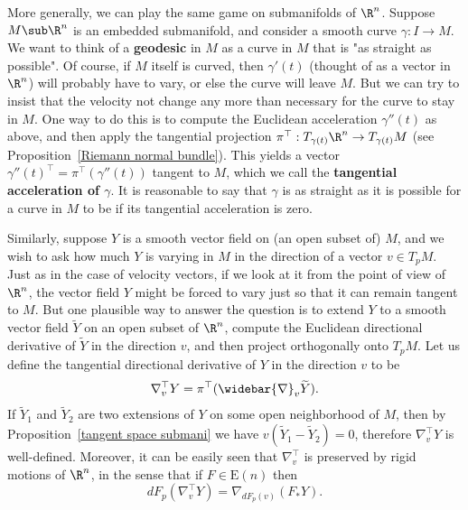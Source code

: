 More generally, we can play the same game on submanifolds of $\R^n$. Suppose $M\sub\R^n$ is an embedded submanifold, and consider a smooth curve $\gamma:I\to M$. We want to think of a \textbf{geodesic} in $M$ as a curve in $M$ that is "as straight as possible". Of course, if $M$ itself is curved, then $\gamma'(t)$ (thought of as a vector in $\R^n$) will probably have to vary, or else the curve will leave $M$. But we can try to insist that the velocity not change any more than necessary for the curve to stay in $M$. One way to do this is to compute the Euclidean acceleration $\gamma''(t)$ as above, and then apply the tangential projection $\pi^{\top}:T_{\gamma(t)}\R^n\to T_{\gamma(t)}M$ (see Proposition~\ref{Riemann normal bundle}). This yields a vector $\gamma''(t)^{\top}=\pi^{\top}(\gamma''(t))$ tangent to $M$, which we call the \textbf{tangential acceleration of $\gamma$}. It is reasonable to say that $\gamma$ is as straight as it is possible for a curve in $M$ to 
be if its tangential acceleration is zero.\par
Similarly, suppose $Y$ is a smooth vector field on (an open subset of) $M$, and we wish to ask how much $Y$ is varying in $M$ in the direction of a vector $v\in T_pM$. Just as in the case of velocity vectors, if we look at it from the point of view of $\R^n$, the vector field $Y$ might be forced to vary just so that it can remain tangent to $M$. But one plausible way to answer the question is to extend $Y$ to a smooth vector field $\widetilde{Y}$ on an open subset of $\R^n$, compute the Euclidean directional derivative of $\widetilde{Y}$ in the direction $v$, and then project orthogonally onto $T_pM$. Let us define the tangential directional derivative of $Y$ in the direction $v$ to be 
\begin{align}\label{Euclidean tangential derivative}
\nabla^{\top}_vY=\pi^{\top}(\widebar{\nabla}_v\widetilde{Y}).
\end{align}
If $\widetilde{Y}_1$ and $\widetilde{Y}_2$ are two extensions of $Y$ on some open neighborhood 
of $M$, then by Proposition~\ref{tangent space submani} we have $v(\widetilde{Y}_1-\widetilde{Y}_2)=0$, 
therefore $\nabla^{\top}_vY$ is well-defined. Moreover, it can be easily seen that $\nabla_v^{\top}$ is 
preserved by rigid motions of $\R^n$, in the sense that if $F\in\mathrm{E}(n)$ then 
\[dF_p(\nabla_v^{\top}Y)=\nabla_{dF_p(v)}(F_*Y).\]

